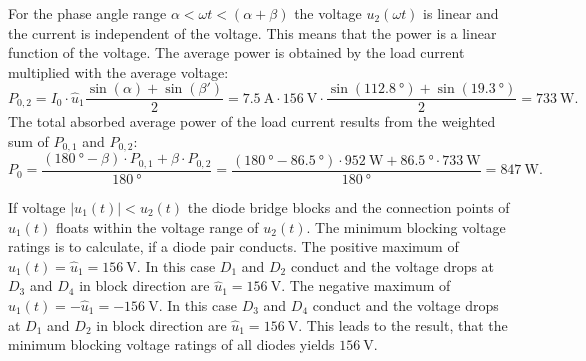 \begin{solutionblock}
    For the phase angle range $\alpha<\omega t<(\alpha+\beta)$ the voltage $u_\mathrm{2}(\omega t)$ is linear and the current is independent of the voltage.
    This means that the power is a linear function of the voltage. The average power is obtained by the load current multiplied
    with the average voltage:
    \begin{equation} 
        P_\mathrm{0,2}=I_{\mathrm{0}} \cdot \hat{u}_\mathrm{1}\frac{\sin(\alpha) + \sin(\beta')}{2}=
        \SI{7.5}{\ampere} \cdot \SI{156}{\volt} \cdot \frac{\sin(\SI{112.8}{\degree}) + \sin(\SI{19.3}{\degree})}{2}=
        \SI{733}{\watt}.
    \end{equation}
    The total absorbed average power of the load current results from the weighted sum of $P_\mathrm{0,1}$ and $P_\mathrm{0,2}$:
    \begin{equation} 
        P_\mathrm{0}=\frac{(\SI{180}{\degree}-\beta) \cdot P_\mathrm{0,1}+ \beta \cdot P_\mathrm{0,2}}{\SI{180}{\degree}}
        =\frac{(\SI{180}{\degree}-\SI{86.5}{\degree}) \cdot \SI{952}{\watt}+\SI{86.5}{\degree} \cdot \SI{733}{\watt}}{\SI{180}{\degree}}=\SI{847}{\watt}.
    \end{equation}
    
\end{solutionblock}

\begin{solutionblock}
    If voltage $\left| u_\mathrm{1}(t) \right| < u_\mathrm{2}(t)$ the diode bridge blocks and the connection points of $u_\mathrm{1}(t)$
    floats within the voltage range of $u_\mathrm{2}(t)$. The minimum blocking voltage ratings is to calculate, if a diode pair conducts.
    The positive maximum of ${u}_\mathrm{1}(t)=\hat{u}_\mathrm{1}=\SI{156}{\volt}$. In this case $D_\mathrm{1}$
    and $D_\mathrm{2}$ conduct and the voltage drops at $D_\mathrm{3}$ and $D_\mathrm{4}$ in block direction are $\hat{u}_\mathrm{1}=\SI{156}{\volt}$.
    The negative maximum of ${u}_\mathrm{1}(t)=-\hat{u}_\mathrm{1}=-\SI{156}{\volt}$. In this case $D_\mathrm{3}$
    and $D_\mathrm{4}$ conduct and the voltage drops at $D_\mathrm{1}$ and $D_\mathrm{2}$ in block direction are $\hat{u}_\mathrm{1}=\SI{156}{\volt}$.
    This leads to the result, that the minimum blocking voltage ratings of all diodes yields $\SI{156}{\volt}$.
\end{solutionblock}

